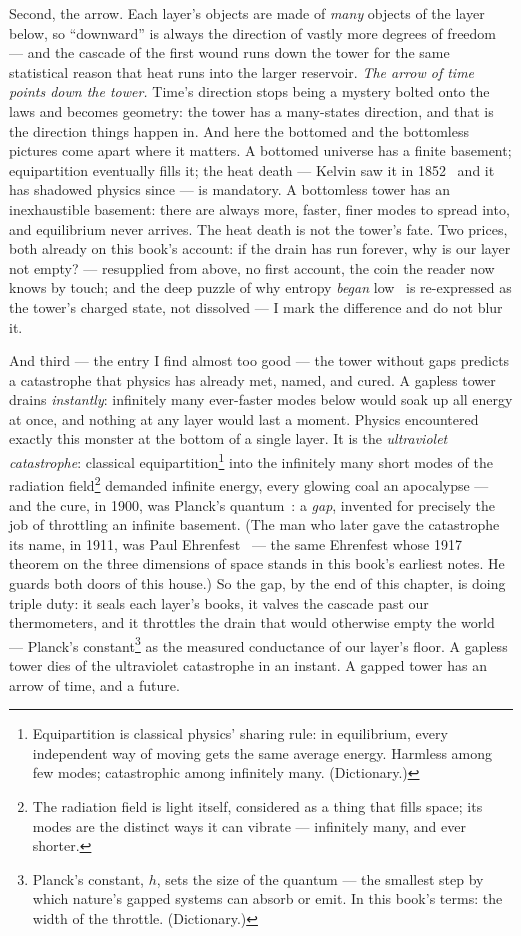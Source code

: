 \documentclass[fontsize=11pt,paper=a4,pagesize=auto,parskip=half-]{scrbook}
\begin{document}
Second, the arrow. Each layer's objects are made of \emph{many} objects of the layer below, so ``downward'' is always the direction of vastly more degrees of freedom --- and the cascade of the first wound runs down the tower for the same statistical reason that heat runs into the larger reservoir. \emph{The arrow of time points down the tower.} Time's direction stops being a mystery bolted onto the laws and becomes geometry: the tower has a many-states direction, and that is the direction things happen in. And here the bottomed and the bottomless pictures come apart where it matters. A bottomed universe has a finite basement; equipartition eventually fills it; the heat death --- Kelvin saw it in 1852~\cite{kelvin1852} and it has shadowed physics since --- is mandatory. A bottomless tower has an inexhaustible basement: there are always more, faster, finer modes to spread into, and equilibrium never arrives. The heat death is not the tower's fate. Two prices, both already on this book's account: if the drain has run forever, why is our layer not empty? --- resupplied from above, no first account, the coin the reader now knows by touch; and the deep puzzle of why entropy \emph{began} low~\cite{albert2000} is re-expressed as the tower's charged state, not dissolved --- I mark the difference and do not blur it.

And third --- the entry I find almost too good --- the tower without gaps predicts a catastrophe that physics has already met, named, and cured. A gapless tower drains \emph{instantly}: infinitely many ever-faster modes below would soak up all energy at once, and nothing at any layer would last a moment. Physics encountered exactly this monster at the bottom of a single layer. It is the \emph{ultraviolet catastrophe}: classical equipartition\footnote{Equipartition is classical physics' sharing rule: in equilibrium, every independent way of moving gets the same average energy. Harmless among few modes; catastrophic among infinitely many. (Dictionary.)} into the infinitely many short modes of the radiation field\footnote{The radiation field is light itself, considered as a thing that fills space; its modes are the distinct ways it can vibrate --- infinitely many, and ever shorter.} demanded infinite energy, every glowing coal an apocalypse --- and the cure, in 1900, was Planck's quantum~\cite{planck1900}: a \emph{gap}, invented for precisely the job of throttling an infinite basement. (The man who later gave the catastrophe its name, in 1911, was Paul Ehrenfest~\cite{ehrenfest1911} --- the same Ehrenfest whose 1917 theorem on the three dimensions of space stands in this book's earliest notes. He guards both doors of this house.) So the gap, by the end of this chapter, is doing triple duty: it seals each layer's books, it valves the cascade past our thermometers, and it throttles the drain that would otherwise empty the world --- Planck's constant\footnote{Planck's constant, $h$, sets the size of the quantum --- the smallest step by which nature's gapped systems can absorb or emit. In this book's terms: the width of the throttle. (Dictionary.)} as the measured conductance of our layer's floor. A gapless tower dies of the ultraviolet catastrophe in an instant. A gapped tower has an arrow of time, and a future.
\end{document}
